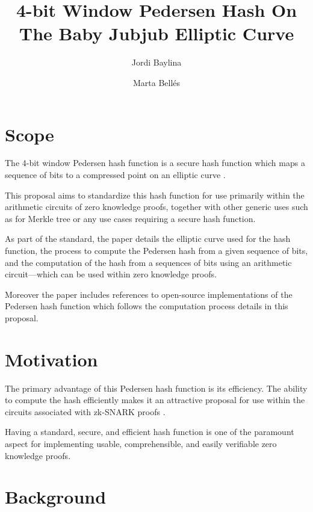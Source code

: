 \documentclass{article}
\title{4-bit Window Pedersen Hash On The Baby Jubjub Elliptic Curve}
\author[1]{Jordi Baylina}
\author[1,2]{Marta Bellés}
\affil[1]{iden3}
\affil[2]{Universitat Pompeu Fabra}
\date{}
\begin{document}
\begin{spacing}{1.2}

\maketitle 
\vspace{-0.2cm}
\tableofcontents

\vspace{0.5cm}
		
\newpage
		
\section{Scope}

The 4-bit window Pedersen hash function is a secure hash function which maps a sequence of bits to a compressed point on an elliptic curve \cite{pedersen-gen}.

This proposal aims to standardize this hash function for use primarily within the arithmetic circuits of zero knowledge proofs, together with other generic uses such as for Merkle tree or any use cases requiring a secure hash function.

As part of the standard, the paper details the elliptic curve used for the hash function, the process to compute the Pedersen hash from a given sequence of bits,
and the computation of the hash from a sequences of bits using an arithmetic circuit---which can be used within zero knowledge proofs.

Moreover the paper includes references to open-source implementations of the Pedersen hash function which follows the computation process details in this proposal.

\section{Motivation}

The primary advantage of this Pedersen hash function is its efficiency. The ability to compute the hash efficiently makes it an attractive proposal for use within the circuits associated with zk-SNARK proofs \cite{efficiency}.

Having a standard, secure, and efficient hash function is one of the paramount aspect for implementing usable, comprehensible, and easily verifiable zero knowledge proofs.

\section{Background}


\end{spacing}
\end{document}

